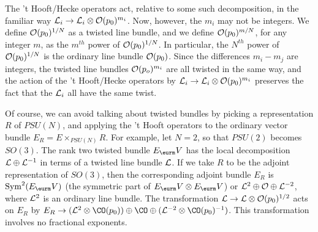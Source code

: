 The 't Hooft/Hecke operators act, relative to some such
decomposition, in the familiar way  ${\cal L}_i\to{\cal
L}_i\otimes {\cal O}(p_0)^{m_i}$.  Now, however, the $m_i$ may not
be integers.  We define ${\cal O}(p_0)^{1/N}$ as a twisted line
bundle, and we define ${\cal O}(p_0)^{m/N}$, for any integer $m$,
as the $m^{th}$ power of ${\cal O}(p_0)^{1/N}$.  In particular,
the $N^{th}$ power of ${\cal O}(p_0)^{1/N}$ is the ordinary line
bundle ${\cal O}(p_0)$.  Since the differences $m_i-m_j$ are
integers, the twisted line bundles ${\cal O}(p_o)^{m_i}$ are all
twisted in the same way, and the action of the 't Hooft/Hecke
operators by ${\cal L}_i\to {\cal L}_i\otimes {\cal O}(p_0)^{m_i}$
preserves the fact that the ${\cal L}_i$ all have the same twist.

Of course, we can avoid talking about twisted bundles by picking a
representation $R$ of $PSU(N)$, and applying the 't Hooft
operators to the ordinary vector bundle $E_R=E\times_{PSU(N)}R$.
For example, let $N=2$, so that $PSU(2)$ becomes $SO(3)$. The rank
two twisted bundle $E_\VV$ has the local decomposition ${\cal
L}\oplus {\cal L}^{-1}$ in terms of a twisted line bundle ${\cal
L}$. If we take $R$ to be the adjoint representation of $SO(3)$,
then the corresponding adjoint bundle $E_R$ is ${\rm
Sym}^2(E_\VV)$ (the symmetric part of $E_\VV\otimes E_\VV$) or
${\cal L}^2\oplus {\cal O}\oplus {\cal L}^{-2}$, where ${\cal
L}^2$ is an ordinary line bundle.  The transformation ${\cal L}\to
{\cal L}\otimes {\cal O}(p_0)^{1/2}$ acts on $E_R$  by $E_R\to
({\cal L}^2\otimes \CO(p_0))\oplus \CO\oplus ({\cal L}^{-2}\otimes
\CO(p_0)^{-1})$.  This transformation involves no fractional
exponents.
